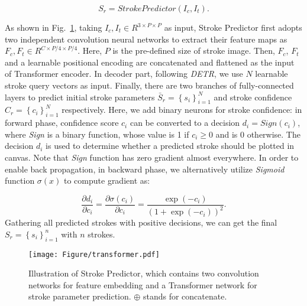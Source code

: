 \documentclass[10pt,twocolumn,letterpaper]{article}
\begin{document}
\begin{equation}
S_r = StrokePredictor(I_c, I_t).
\end{equation}

As shown in Fig.~\ref{fig:stroke_predictor}, taking $I_c, I_t \in R^{3\times P \times P}$ as input, Stroke Predictor first adopts two independent convolution neural networks to extract their feature maps as $F_c, F_t \in R^{C\times P/4 \times P/4}$.
Here, $P$ is the pre-defined size of stroke image. Then, $F_c$, $F_t$ and a learnable positional encoding are concatenated and flattened as the input of Transformer encoder. 
In decoder part, following \textit{DETR}, we use $N$ learnable stroke query vectors as input.
Finally, there are two branches of fully-connected layers to predict initial stroke parameters $\bar{S}_r = \left \{ s_i \right \}_{i=1}^N$ and stroke confidence $C_r = \left \{ c_i \right \}_{i=1}^N$ respectively. 
Here, we add binary neurons for stroke confidence: in forward phase, confidence score $c_i$ can be converted to a decision $d_i = Sign(c_i)$,
where \textit{Sign} is a binary function, whose value is 1 if $c_i \geq 0$ and is 0 otherwise.
The decision $d_i$ is used to determine whether a predicted stroke should be plotted in canvas. 
Note that \textit{Sign} function has zero gradient almost everywhere. In order to enable back propagation, in backward phase, we alternatively utilize \textit{Sigmoid} function $\sigma(x)$ to compute gradient as:

\begin{equation}
    \frac{\partial d_i}{\partial c_i}=\frac{\partial\sigma(c_i)}{\partial c_i}=\frac{\exp(-c_i)}{(1+\exp(-c_i))^2}.
\end{equation}
Gathering all predicted strokes with positive decisions, we can get the final $S_r = \left \{ s_i \right \}_{i=1}^n$ with $n$ strokes. 











\begin{figure}[t]
\begin{center}
\texttt{[image: Figure/transformer.pdf]}
\end{center}
   \caption{Illustration of Stroke Predictor, which contains two convolution networks for feature embedding and a Transformer network for stroke parameter prediction. $\oplus $ stands for concatenate.}
\label{fig:stroke_predictor}
\vspace{-0.5cm}
\end{figure}
\end{document}
